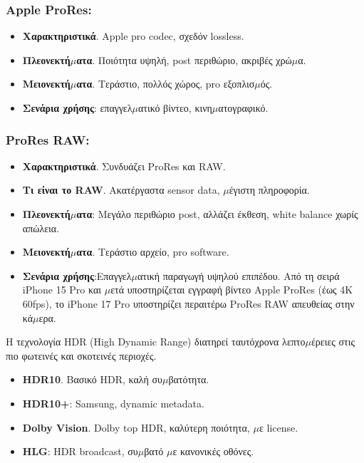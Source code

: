 \subsubsection*{Apple ProRes:}

\begin{itemize}
  \item \textbf{Χαρακτηριστικά}. Apple pro codec, σχεδόν lossless.
  \item \textbf{Πλεονεκτή$\mu$ατα}. Ποιότητα υψηλή, post περιθώριο, ακριβές χρώ$\mu$α.
  \item \textbf{Μειονεκτή$\mu$ατα}. Τεράστιο, πολλός χώρος, pro εξοπλισ$\mu$ός.
  \item \textbf{Σενάρια χρήσης}: επαγγελ$\mu$ατικό βίντεο, κινη$\mu$ατογραφικό.
\end{itemize}

\subsubsection*{ProRes RAW:}

\begin{itemize}
  \item \textbf{Χαρακτηριστικά}. Συνδυάζει ProRes και RAW.
  \item \textbf{Τι είναι το RAW}. Ακατέργαστα sensor data, $\mu$έγιστη πληροφορία.
  \item \textbf{Πλεονεκτή$\mu$ατα}: Μεγάλο περιθώριο post, αλλάζει έκθεση, white balance χωρίς απώλεια.
  \item \textbf{Μειονεκτή$\mu$ατα}. Τεράστιο αρχείο, pro software.
  \item \textbf{Σενάρια χρήσης}:Επαγγελ$\mu$ατική παραγωγή υψηλού επιπέδου. Από τη σειρά iPhone 15 Pro και $\mu$ετά υποστηρίζεται εγγραφή βίντεο Apple ProRes (έως 4K 60fps), το iPhone 17 Pro υποστηρίζει περαιτέρω ProRes RAW απευθείας στην κά$\mu$ερα.
\end{itemize}


Η τεχνολογία HDR (High Dynamic Range) διατηρεί ταυτόχρονα λεπτο$\mu$έρειες στις πιο φωτεινές και σκοτεινές περιοχές.

\begin{itemize}
  \item \textbf{HDR10}. Βασικό HDR, καλή συ$\mu$βατότητα.
  \item \textbf{HDR10+}: Samsung, dynamic metadata.
  \item \textbf{Dolby Vision}. Dolby top HDR, καλύτερη ποιότητα, $\mu$ε license.
  \item \textbf{HLG}: HDR broadcast, συ$\mu$βατό $\mu$ε κανονικές οθόνες.
\end{itemize}

